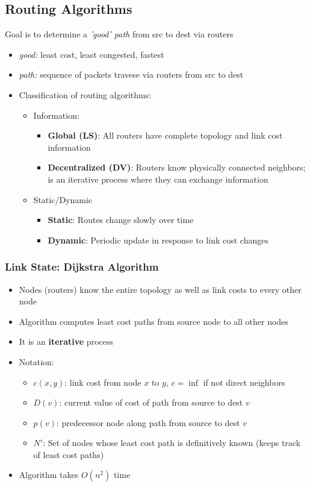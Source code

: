 \documentclass{article}
\begin{document}
\subsection{Routing Algorithms}
Goal is to determine a \textit{'good' path} from src to dest via routers
\begin{itemize}
    \item \textit{good:} least cost, least congested, fastest
    \item \textit{path:} sequence of packets travese via routers from src to dest
    \item Classification of routing algorithms:
    \begin{itemize}
        \item Information:
        \begin{itemize}
            \item \textbf{Global (LS)}: All routers have complete topology and link cost information
            \item \textbf{Decentralized (DV)}: Routers know physically connected neighbors; is an
            iterative process where they can exchange information
        \end{itemize}
        \item Static/Dynamic
        \begin{itemize}
            \item \textbf{Static}: Routes change slowly over time
            \item \textbf{Dynamic}: Periodic update in response to link cost changes
        \end{itemize}
    \end{itemize}
\end{itemize}

\subsubsection{Link State: Dijkstra Algorithm}
\begin{itemize}
    \item Nodes (routers) know the entire topology as well as link costs to every other node
    \item Algorithm computes least cost paths from source node to all other nodes
    \item It is an \textbf{iterative} process
    \item Notation:
    \begin{itemize}
        \item $c(x,y)$: link cost from node $x$ to $y$, $c=\inf$ if not direct neighbors
        \item $D(v)$: current value of cost of path from source to dest $v$
        \item $p(v)$: predecessor node along path from source to dest $v$
        \item $N'$: Set of nodes whose least cost path is definitively known (keeps track of least cost paths)
    \end{itemize}
    \item Algorithm takes $O(n^2)$ time
\end{itemize}
\end{document}
